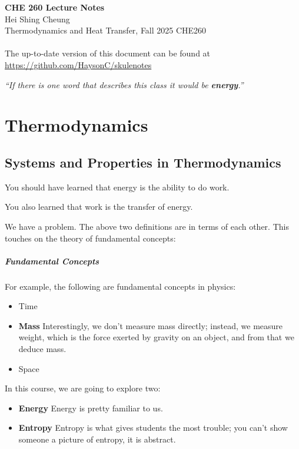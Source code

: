 \documentclass[11pt]{report}
\begin{document}
\thispagestyle{empty}
{\LARGE \bf CHE 260 Lecture Notes}\\
{\large Hei Shing Cheung}\\
Thermodynamics and Heat Transfer, Fall 2025 \hfill CHE260\\
\\
The up-to-date version of this document can be found at \url{https://github.com/HaysonC/skulenotes}\\

\begin{center}
    \textit{``If there is one word that describes this class it would be \textbf{energy}.''}
\end{center}
\chapter{Thermodynamics}

\section{Systems and Properties in Thermodynamics}
\begin{definition}[Energy]
    You should have learned that energy is the ability to do work.
\end{definition}


\begin{definition}[Work]
    You also learned that work is the transfer of energy.
\end{definition}

We have a problem. The above two definitions are in terms of each other. This touches on the theory of fundamental concepts:

\paragraph{Fundamental Concepts} For example, the following are fundamental concepts in physics:
\begin{itemize}
    \item Time
    \item \textbf{Mass} Interestingly, we don't measure mass directly; instead, we measure weight, which is the force exerted by gravity on an object, and from that we deduce mass.
    \item Space
\end{itemize}
In this course, we are going to explore two:
\begin{itemize}
    \item \textbf{Energy} Energy is pretty familiar to us. 
    \item \textbf{Entropy} Entropy is what gives students the most trouble; you can't show someone a picture of entropy, it is abstract.
\end{itemize}
\end{document}
